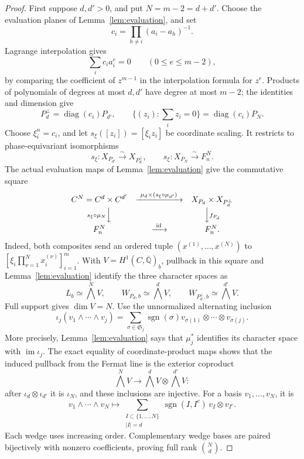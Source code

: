 \documentclass[11pt]{article}
\newcommand{\Q}{\mathbb Q}
\newcommand{\id}{\operatorname{id}}
\newcommand{\kk}{\overline{\Q}}
\theoremstyle{plain}
\theoremstyle{definition}
\theoremstyle{remark}
\numberwithin{equation}{section}
\begin{document}
\begin{proof}
First suppose \(d,d'>0\), and put \(N=m-2=d+d'\).
Choose the evaluation planes of Lemma~\ref{lem:evaluation}, and set
\[
 c_i=\prod_{h\ne i}(a_i-a_h)^{-1}.
\]
Lagrange interpolation gives
\[
 \sum_i c_i a_i^e=0\qquad(0\leq e\leq m-2),
\]
by comparing the coefficient of \(z^{m-1}\) in the interpolation
formula for \(z^e\).  Products of polynomials of degrees at most
\(d,d'\) have degree at most \(m-2\); the identities and dimension
give
\[
 P_d^\perp=\operatorname{diag}(c_i)P_{d'},\qquad
 \{(z_i):\sum_i z_i=0\}=\operatorname{diag}(c_i)P_N.
\]
Choose \(\xi_i^n=c_i\), and let
\(s_\xi([z_i])=[\xi_i z_i]\) be coordinate scaling.
It restricts to phase-equivariant isomorphisms
\[
 s_\xi:X_{P_{d'}}\xrightarrow{\sim}X_{P_d^\perp},
 \qquad
 s_\xi:X_{P_N}\xrightarrow{\sim}F_n^N.
\]
The actual evaluation maps of Lemma~\ref{lem:evaluation} give
the commutative square
\[
\begin{array}{ccc}
 C^N=C^d\times C^{d'}
 &\xrightarrow{\ \mu_d\times(s_\xi\circ\mu_{d'})\ }&
 X_{P_d}\times X_{P_d^\perp}\\[3pt]
 {\scriptstyle s_\xi\circ\mu_N}\Big\downarrow
 &&\Big\downarrow{\scriptstyle f_{P_d}}\\[3pt]
 F_n^N&\xrightarrow{\ \id\ }&F_n^N .
\end{array}
\]
Indeed, both composites send an ordered tuple
\((x^{(1)},\ldots,x^{(N)})\) to
\([\xi_i\prod_{\nu=1}^N x_i^{(\nu)}]_{i=1}^m\).
With \(V=H^1(C,\kk)_b\), pullback in this square and
Lemma~\ref{lem:evaluation} identify the three character spaces as
\[
 L_b\simeq\bigwedge^N V,\qquad
 W_{P_d,b}\simeq\bigwedge^d V,\qquad
 W_{P_d^\perp,b}\simeq\bigwedge^{d'}V.
\]
Full support gives \(\dim V=N\).
Use the unnormalized alternating inclusion
\[
 \iota_j(v_1\wedge\cdots\wedge v_j)
 =\sum_{\sigma\in\mathfrak S_j}\operatorname{sgn}(\sigma)
 v_{\sigma(1)}\otimes\cdots\otimes v_{\sigma(j)}.
\]
More precisely, Lemma~\ref{lem:evaluation} says that \(\mu_j^*\)
identifies its character space with \(\operatorname{im}\iota_j\).
The exact equality of coordinate-product maps shows that the
induced pullback from the Fermat line is the exterior coproduct
\[
 \bigwedge^N V\longrightarrow\bigwedge^d V\otimes\bigwedge^{d'}V:
\]
after \(\iota_d\otimes\iota_{d'}\) it is \(\iota_N\), and these
inclusions are injective.  For a basis \(v_1,\ldots,v_N\), it is
\[
 v_1\wedge\cdots\wedge v_N\longmapsto
 \sum_{\substack{I\subset\{1,\ldots,N\}\\ |I|=d}}
 \operatorname{sgn}(I,I^c)\,v_I\otimes v_{I^c}.
\]
Each wedge uses increasing order.  Complementary wedge bases are
paired bijectively with nonzero coefficients, proving full rank
\(\binom{N}{d}\).


\end{proof}
\end{document}
